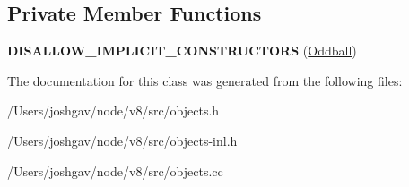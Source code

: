 \subsection*{Private Member Functions}
\begin{DoxyCompactItemize}
\item 
{\bfseries D\+I\+S\+A\+L\+L\+O\+W\+\_\+\+I\+M\+P\+L\+I\+C\+I\+T\+\_\+\+C\+O\+N\+S\+T\+R\+U\+C\+T\+O\+RS} (\hyperlink{classv8_1_1internal_1_1_oddball}{Oddball})\hypertarget{classv8_1_1internal_1_1_oddball_accd612bcde4de80c2037666e44419fa5}{}\label{classv8_1_1internal_1_1_oddball_accd612bcde4de80c2037666e44419fa5}

\end{DoxyCompactItemize}


The documentation for this class was generated from the following files\+:\begin{DoxyCompactItemize}
\item 
/\+Users/joshgav/node/v8/src/objects.\+h\item 
/\+Users/joshgav/node/v8/src/objects-\/inl.\+h\item 
/\+Users/joshgav/node/v8/src/objects.\+cc\end{DoxyCompactItemize}
